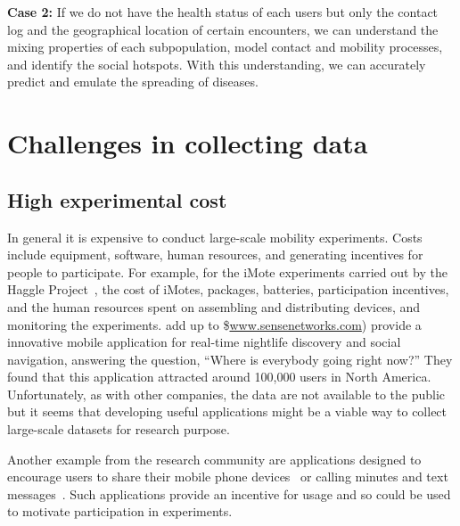 \documentclass{sig-alternate-10pt}
\begin{document}
\textbf{Case 2:} If we do not have the health status of each users but
only the contact log and the geographical location of certain
encounters, we can understand the mixing properties of each
subpopulation, model contact and mobility processes, and identify the
social hotspots. With this understanding, we can accurately predict
and emulate the spreading of diseases.
\vspace{-1mm}
\section{Challenges in collecting data}
\vspace{-2mm}
\subsection{High experimental cost}
In general it is expensive to conduct large-scale mobility
experiments.  Costs include equipment, software, human resources, and
generating incentives for people to participate.  For example, for the
iMote experiments carried out by the Haggle
Project~\cite{psn-mobihoc}, the cost of iMotes, packages, batteries,
participation incentives, and the human resources spent on
assembling and distributing devices, and monitoring the experiments.
add up to \$\url{www.sensenetworks.com}) provide a
innovative mobile application for real-time nightlife discovery and
social navigation, answering the question, ``Where is everybody going
right now?''  They found that this application attracted around
100,000 users in North America.  Unfortunately, as with other
companies, the data are not available to the public but it seems that
developing useful applications might be a viable way to collect
large-scale datasets for research purpose.

Another example from the research community are applications designed
to encourage users to share their mobile phone
devices~\cite{liu:xshare} or calling minutes and text
messages~\cite{psn-shair}. Such applications provide an incentive for
usage and so could be used to motivate participation in experiments.
\vspace{-1mm}
\end{document}
